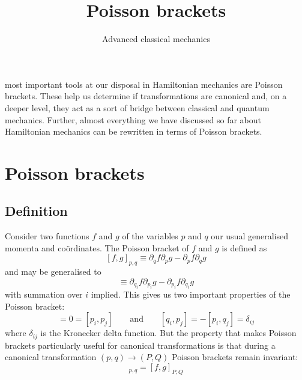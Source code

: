 \documentclass[english,seminar,headertitle]{lecture}
\title{Poisson brackets}
\subtitle{Advanced classical mechanics}
\begin{document}
	
\noindent{} most important tools at our disposal in Hamiltonian mechanics are Poisson brackets. These help us determine if transformations are canonical and, on a deeper level, they act as a sort of bridge between classical and quantum mechanics. Further, almost everything we have discussed so far about Hamiltonian mechanics can be rewritten in terms of Poisson brackets.

\section{Poisson brackets}
\subsection{Definition}
Consider two functions $f$ and $g$ of the variables $p$ and $q$ our usual generalised momenta and co\"{o}rdinates. The Poisson bracket of $f$ and $g$ is defined as
$$
[f, g]_{p,q} \equiv \partial_q f \partial_p g - \partial_p f \partial_q g
$$
and may be generalised to
\begin{equation}
	[f, g] \equiv \partial_{q_i} f \partial_{p_i} g - \partial_{p_i} f \partial_{q_i} g \label{eq:pbrackets}
\end{equation}%
with summation over $i$ implied. This gives us two important properties of the Poisson bracket:
\begin{equation}
	[q_i,q_j] = 0 = [p_i,p_j] \qquad\textrm{and}\qquad	[q_i,p_j] = -[p_i,q_j] = \delta_{ij} \label{eq:basic-prop}
\end{equation}%
where $\delta_{ij}$ is the Kronecker delta function. But the property that makes Poisson brackets particularly useful for canonical transformations is that during a canonical transformation $(p, q) \rightarrow (P, Q)$ Poisson brackets remain invariant:
\begin{equation}
	[f,g]_{p,q} = [f,g]_{P,Q} \label{eq:invariance}
\end{equation}
\end{document}
